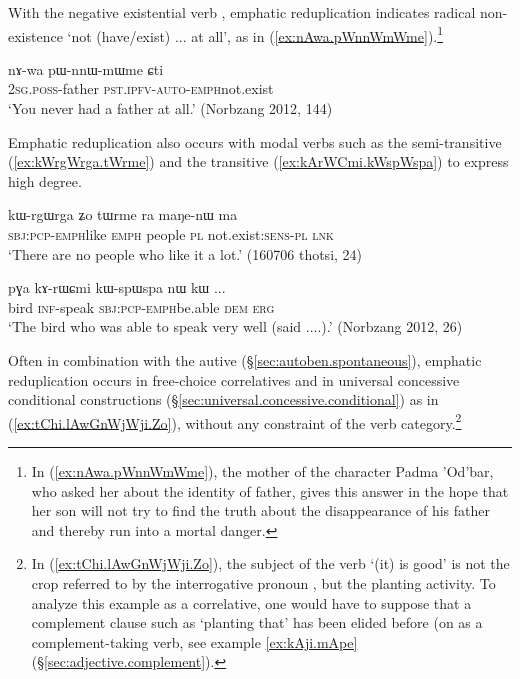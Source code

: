 With the negative existential verb , emphatic reduplication indicates radical non-existence `not (have/exist) ... at all', as in (\ref{ex:nAwa.pWnnWmWme}).\footnote{In (\ref{ex:nAwa.pWnnWmWme}), the mother of the character Padma 'Od'bar, who asked her about the identity of  father, gives this answer in the hope that her son will not try to find the truth about the disappearance of his father and thereby run into a mortal danger. }

\begin{exe}
\ex \label{ex:nAwa.pWnnWmWme}
\gll nɤ-wa pɯ-nnɯ-mɯ\redp{}me ɕti \\
 \textsc{2sg}.\textsc{poss}-father \textsc{pst}.\textsc{ipfv}-\textsc{auto}-\textsc{emph}\redp{}not.exist \\
\glt `You never had a father at all.' (Norbzang 2012, 144)
\end{exe}

Emphatic reduplication also occurs with modal verbs such as the semi-transitive   (\ref{ex:kWrgWrga.tWrme}) and the transitive  (\ref{ex:kArWCmi.kWspWspa}) to express high degree.

\begin{exe}
\ex \label{ex:kWrgWrga.tWrme}
\gll  kɯ-rgɯ\redp{}rga ʑo tɯrme ra maŋe-nɯ ma  \\
\textsc{sbj}:\textsc{pcp}-\textsc{emph}\redp{}like \textsc{emph} people \textsc{pl} not.exist:\textsc{sens}-\textsc{pl} \textsc{lnk} \\
\glt `There are no people who like it a lot.' (160706 thotsi, 24)
\end{exe}

\begin{exe}
\ex \label{ex:kArWCmi.kWspWspa}
\gll pɣa kɤ-rɯɕmi kɯ-spɯ\redp{}spa nɯ kɯ ... \\
bird \textsc{inf}-speak \textsc{sbj}:\textsc{pcp}-\textsc{emph}\redp{}be.able \textsc{dem} \textsc{erg} \\
\glt `The bird who was able to speak very well (said ....).' (Norbzang 2012, 26)
\end{exe}

Often in combination with the autive  (§\ref{sec:autoben.spontaneous}), emphatic reduplication occurs in free-choice correlatives and in universal concessive conditional constructions (§\ref{sec:universal.concessive.conditional}) as in (\ref{ex:tChi.lAwGnWjWji.Zo}), without any constraint of the verb category.\footnote{In (\ref{ex:tChi.lAwGnWjWji.Zo}), the subject of the verb  `(it) is good' is not the crop referred to by the interrogative pronoun , but the planting activity. To analyze this example as a correlative, one would have to suppose that a complement clause such as  `planting that' has been elided before  (on  as a complement-taking verb, see example \ref{ex:kAji.mApe} (§\ref{sec:adjective.complement}).  }

